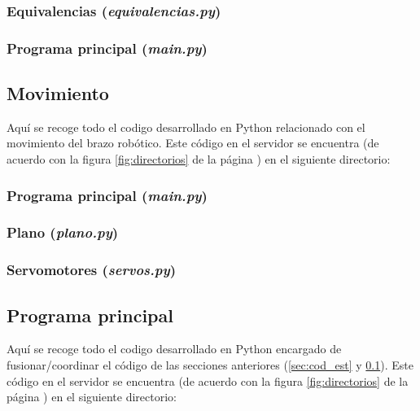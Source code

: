 \subsubsection*{Equivalencias (\textit{equivalencias.py})}
\subsubsection*{Programa principal (\textit{main.py})}


\subsection{Movimiento} \label{sec:cod_mov}
Aquí se recoge todo el codigo desarrollado en Python 
relacionado con el movimiento del brazo robótico. Este código en el servidor se
encuentra (de acuerdo con la figura \ref{fig:directorios} de la página
\pageref{fig:directorios}) en el siguiente directorio: \\


\subsubsection*{Programa principal (\textit{main.py})}
\subsubsection*{Plano (\textit{plano.py})}
\subsubsection*{Servomotores (\textit{servos.py})}


\subsection{Programa principal}
Aquí se recoge todo el codigo desarrollado en Python 
encargado de fusionar/coordinar el código de las secciones anteriores
(\ref{sec:cod_est} y \ref{sec:cod_mov}). Este código en el servidor se
encuentra (de acuerdo con la figura \ref{fig:directorios} de la página
\pageref{fig:directorios}) en el siguiente directorio: \\

